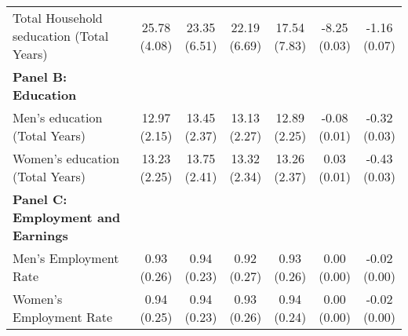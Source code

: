 \begin{table}[!h]
{\begin{threeparttable}
\begin{tabular}[t]{lcccccc}
\hspace{1em}Total Household seducation (Total Years) & \specialcell{25.78\\(4.08)} & \specialcell{23.35\\(6.51)} & \specialcell{22.19\\(6.69)} & \specialcell{17.54\\(7.83)} & \specialcell{-8.25\\(0.03)} & \specialcell{-1.16\\(0.07)}\\
\textbf{Panel B: Education} & \textbf{} & \textbf{} & \textbf{} & \textbf{} & \textbf{} & \textbf{}\\
\addlinespace
\hspace{1em}Men’s education (Total Years) & \specialcell{12.97\\(2.15)} & \specialcell{13.45\\(2.37)} & \specialcell{13.13\\(2.27)} & \specialcell{12.89\\(2.25)} & \specialcell{-0.08\\(0.01)} & \specialcell{-0.32\\(0.03)}\\
\hspace{1em}Women’s education (Total Years) & \specialcell{13.23\\(2.25)} & \specialcell{13.75\\(2.41)} & \specialcell{13.32\\(2.34)} & \specialcell{13.26\\(2.37)} & \specialcell{0.03\\(0.01)} & \specialcell{-0.43\\(0.03)}\\
\textbf{Panel C: Employment and Earnings} & \textbf{} & \textbf{} & \textbf{} & \textbf{} & \textbf{} & \textbf{}\\
\hspace{1em}Men’s Employment Rate & \specialcell{0.93\\(0.26)} & \specialcell{0.94\\(0.23)} & \specialcell{0.92\\(0.27)} & \specialcell{0.93\\(0.26)} & \specialcell{0.00\\(0.00)} & \specialcell{-0.02\\(0.00)}\\
\hspace{1em}Women’s Employment Rate & \specialcell{0.94\\(0.25)} & \specialcell{0.94\\(0.23)} & \specialcell{0.93\\(0.26)} & \specialcell{0.94\\(0.24)} & \specialcell{0.00\\(0.00)} & \specialcell{-0.02\\(0.00)}\\

\end{tabular}
\end{threeparttable}}
\end{table}
